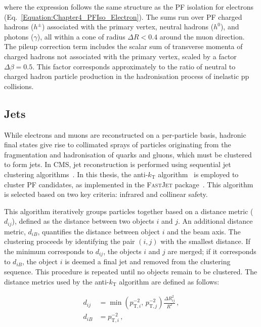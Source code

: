 where the expression follows the same structure as the PF isolation for electrons (Eq.~\ref{Equation:Chapter4_PFIso_Electron}). The sums run over PF charged hadrons ($h^\pm$) associated with the primary vertex, neutral hadrons ($h^0$), and photons ($\gamma$), all within a cone of radius $\Delta R < 0.4$ around the muon direction. The pileup correction term includes the scalar sum of transverse momenta of charged hadrons not associated with the primary vertex, scaled by a factor $\Delta \beta = 0.5$. This factor corresponds approximately to the ratio of neutral to charged hadron particle production in the hadronisation process of inelastic pp collisions.

\subsection{Jets}
\label{Section:Chapter4_Jets}
While electrons and muons are reconstructed on a per-particle basis, hadronic final states give rise to collimated sprays of particles originating from the fragmentation and hadronisation of quarks and gluons, which must be clustered to form jets. In CMS, jet reconstruction is performed using sequential jet clustering algorithms~\cite{Jet_Algorithm_Performance,Jet_Reconstruction_Run2_Run3}. In this thesis, the anti-$k_\mathrm{T}$ algorithm~\cite{anti_kT} is employed to cluster PF candidates, as implemented in the \textsc{FastJet} package~\cite{FastJet}. This algorithm is selected based on two key criteria: infrared and collinear safety.

This algorithm iteratively groups particles together based on a distance metric ($d_{ij}$), defined as the distance between two objects $i$ and $j$. An additional distance metric, $d_{iB}$, quantifies the distance between object $i$ and the beam axis. The clustering proceeds by identifying the pair $(i,j)$ with the smallest distance. If the minimum corresponds to $d_{ij}$, the objects $i$ and $j$ are merged; if it corresponds to $d_{iB}$, the object $i$ is deemed a final jet and removed from the clustering sequence. This procedure is repeated until no objects remain to be clustered. The distance metrics used by the anti-$k_\mathrm{T}$ algorithm are defined as follows: 

\begin{equation}
    \begin{aligned}
        d_{ij} &= \min\left(p_{\mathrm{T},i}^{-2},\, p_{\mathrm{T},j}^{-2}\right) \frac{\Delta R_{ij}^2}{R^2} \,, \\
        d_{iB} &= p_{\mathrm{T},i}^{-2} \,,
    \end{aligned}
\end{equation}

